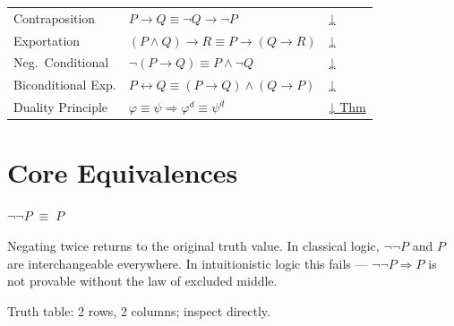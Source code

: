 \begin{tcolorbox}[colback=gray!6, colframe=gray!40, arc=2pt,
  left=6pt, right=6pt, top=4pt, bottom=4pt,
  title={\small\textbf{Logical Equivalences — Quick Reference}},
  fonttitle=\small\bfseries]
\begin{tabular}{l l l}
Contraposition       & $P\rightarrow Q\equiv\neg Q\rightarrow\neg P$ & \hyperref[eq:contra]{↓} \\
Exportation          & $(P\wedge Q)\rightarrow R\equiv P\rightarrow(Q\rightarrow R)$ & \hyperref[eq:export]{↓} \\
Neg.\ Conditional    & $\neg(P\rightarrow Q)\equiv P\wedge\neg Q$ & \hyperref[eq:neg-cond]{↓} \\
Biconditional Exp.   & $P\leftrightarrow Q\equiv(P\rightarrow Q)\wedge(Q\rightarrow P)$ & \hyperref[eq:bicond-exp]{↓} \\
Duality Principle    & $\varphi\equiv\psi \Rightarrow \varphi^d\equiv\psi^d$ & \hyperref[thm:duality]{↓ Thm} \\
\bottomrule
\end{tabular}
\end{tcolorbox}

\vspace{1em}


\section*{Core Equivalences}

\begin{proposition}\label{eq:double-neg}
$\neg\neg P \;\equiv\; P$
\end{proposition}
\begin{remark}[Intuition] Negating twice returns to the original truth value.
In classical logic, $\neg\neg P$ and $P$ are interchangeable everywhere.
In intuitionistic logic this fails — $\neg\neg P \Rightarrow P$ is not provable
without the law of excluded middle.
\end{remark}
\begin{remark} Truth table: 2 rows, 2 columns; inspect directly.
\end{remark}

